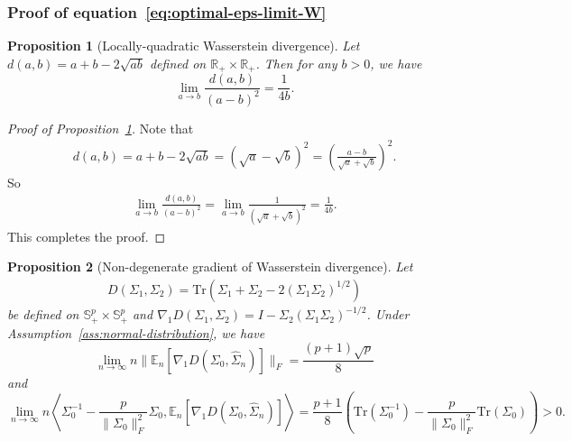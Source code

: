 \documentclass[11pt]{article}
\def\R{\mathbb{R}}
\def\S{\mathbb{S}}
\def\la{\langle}
\def\PSD{{\S^k_{++}}}
\def\ra{\rangle}
\newtheorem{proposition}{Proposition}
\newcommand{\bgeqn}{\begin{eqnarray}}
\newcommand{\edeqn}{\end{eqnarray}}
\def\R{\mathbb{R}}
\def\S{\mathbb{S}}
\def\E {\mathbb{E}}
\def\tr{\mathrm{Tr}}
\def\la{\langle}
\def\PSD{{\S^p_{+}}}
\def\ra{\rangle}
\newcommand{\wh}{\widehat}
\begin{document}
\subsubsection{Proof of equation~\eqref{eq:optimal-eps-limit-W}}
\begin{proposition}[Locally-quadratic Wasserstein divergence]\label{prop:W-frob-like}
    Let $d(a,b)=a+b-2\sqrt{ab}$ defined on $\R_{+}\times \R_{+}$. Then for any $b>0$, we have 
    \[
        \lim_{a\to b} \frac{d(a,b)}{(a-b)^2} = \frac{1}{4b}.
    \]
\end{proposition}
\begin{proof}[Proof of Proposition~\ref{prop:W-frob-like}]
    Note that 
    \begin{align*}
        d(a,b) = a+b-2\sqrt{ab} = (\sqrt{a}-\sqrt{b})^2 = \left(\frac{a-b}{\sqrt{a}+\sqrt{b}}\right)^2.
    \end{align*}
    So
    \begin{align*}
        \lim_{a\to b} \frac{d(a,b)}{(a-b)^2} = \lim_{a\to b} \frac{1}{(\sqrt{a}+\sqrt{b})^2} = \frac{1}{4b}.
    \end{align*}
    This completes the proof.
\end{proof}
\begin{proposition}[Non-degenerate gradient of Wasserstein divergence]\label{prop:W-D'-limit}
    Let \bgeqn 
    D(\Sigma_1, \Sigma_2) = \tr(\Sigma_1+\Sigma_2-2(\Sigma_1\Sigma_2)^{1/2})\edeqn 
    be defined on $\PSD \times \PSD$
    and  ${\nabla_1 D }(\Sigma_1, \Sigma_2) = I - \Sigma_2(\Sigma_1\Sigma_2)^{-1/2}$. Under Assumption~\ref{ass:normal-distribution}, we have 
    \[
        \lim_{n\to\infty} n\|\E_n[{\nabla_1 D }(\Sigma_0, \wh\Sigma_n)]\|_F = \frac{(p+1)\sqrt{p}}{8}
     \]
     and
     \[
        \lim_{n\to\infty} n\left\la \Sigma_0^{-1}-\frac{p}{\|\Sigma_0\|_F^2}\Sigma_0, \E_n [{\nabla_1 D }(\Sigma_0, \wh\Sigma_n)]\right\ra=\frac{p+1}{8}\left(\tr(\Sigma_0^{-1}) - \frac{p}{\|\Sigma_0\|_F^2}\tr(\Sigma_0)\right)> 0.
     \]
\end{proposition}
\end{document}
